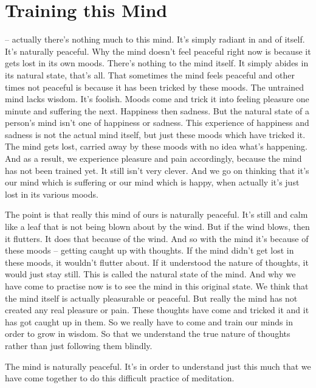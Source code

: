 

\chapter{Training this Mind}

 -- actually there's nothing much to this mind. It's simply radiant in and of itself. It's naturally peaceful. Why the mind doesn't feel peaceful right now is because it gets lost in its own moods. There's nothing to the mind itself. It simply abides in its natural state, that's all. That sometimes the mind feels peaceful and other times not peaceful is because it has been tricked by these moods. The untrained mind lacks wisdom. It's foolish. Moods come and trick it into feeling pleasure one minute and suffering the next. Happiness then sadness. But the natural state of a person's mind isn't one of happiness or sadness. This experience of happiness and sadness is not the actual mind itself, but just these moods which have tricked it. The mind gets lost, carried away by these moods with no idea what's happening. And as a result, we experience pleasure and pain accordingly, because the mind has not been trained yet. It still isn't very clever. And we go on thinking that it's our mind which is suffering or our mind which is happy, when actually it's just lost in its various moods.

The point is that really this mind of ours is naturally peaceful. It's still and calm like a leaf that is not being blown about by the wind. But if the wind blows, then it flutters. It does that because of the wind. And so with the mind it's because of these moods -- getting caught up with thoughts. If the mind didn't get lost in these moods, it wouldn't flutter about. If it understood the nature of thoughts, it would just stay still. This is called the natural state of the mind. And why we have come to practise now is to see the mind in this original state. We think that the mind itself is actually pleasurable or peaceful. But really the mind has not created any real pleasure or pain. These thoughts have come and tricked it and it has got caught up in them. So we really have to come and train our minds in order to grow in wisdom. So that we understand the true nature of thoughts rather than just following them blindly.

The mind is naturally peaceful. It's in order to understand just this much that we have come together to do this difficult practice of meditation.

